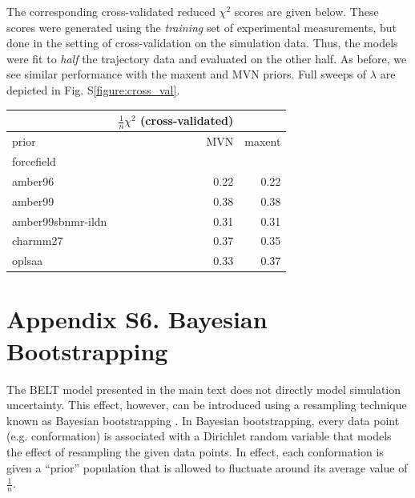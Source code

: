 \documentclass[journal=jacsat,manuscript=article]{achemso}
\begin{document}
\vspace{5mm}

The corresponding cross-validated reduced $\chi^2$ scores are given below.  These scores were generated using the \emph{training} set of experimental measurements, but done in the setting of cross-validation on the simulation data.  Thus, the models were fit to \emph{half} the trajectory data and evaluated on the other half.  As before, we see similar performance with the maxent and MVN priors.  Full sweeps of $\lambda$ are depicted in Fig. S\ref{figure:cross_val}.  

\vspace{5mm}


\begin{tabular}{lrr}
\toprule
{} &  $\frac{1}{n}\chi^2$ (cross-validated) &         \\
\midrule
prior &       MVN &  maxent \\
forcefield        &           &         \\
amber96           &      0.22 &    0.22 \\
amber99           &      0.38 &    0.38 \\
amber99sbnmr-ildn &      0.31 &    0.31 \\
charmm27          &      0.37 &    0.35 \\
oplsaa            &      0.33 &    0.37 \\
\bottomrule
\end{tabular}

\newpage

\section{Appendix S6.  Bayesian Bootstrapping}

The BELT model presented in the main text does not directly model simulation uncertainty.  This effect, however, can be introduced using a resampling technique known as Bayesian bootstrapping \cite{rubin1981}.  In Bayesian bootstrapping, every data point (e.g. conformation) is associated with a Dirichlet random variable that models the effect of resampling the given data points.  In effect, each conformation is given a ``prior'' population that is allowed to fluctuate around its average value of $\frac{1}{n}$.  
\end{document}
